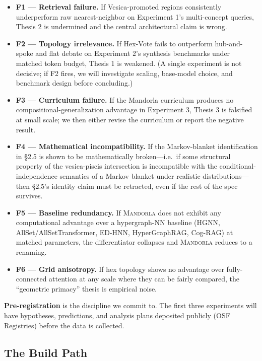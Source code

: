 \documentclass[11pt,a4paper]{article}
\begin{document}
\begin{itemize}[leftmargin=*]
  \item \textbf{F1 --- Retrieval failure.} If Vesica-promoted regions consistently underperform raw nearest-neighbor on Experiment 1's multi-concept queries, Thesis 2 is undermined and the central architectural claim is wrong.
  \item \textbf{F2 --- Topology irrelevance.} If Hex-Vote fails to outperform hub-and-spoke and flat debate on Experiment 2's synthesis benchmarks under matched token budget, Thesis 1 is weakened. (A single experiment is not decisive; if F2 fires, we will investigate scaling, base-model choice, and benchmark design before concluding.)
  \item \textbf{F3 --- Curriculum failure.} If the Mandorla curriculum produces no compositional-generalization advantage in Experiment 3, Thesis 3 is falsified at small scale; we then either revise the curriculum or report the negative result.
  \item \textbf{F4 --- Mathematical incompatibility.} If the Markov-blanket identification in \S 2.5 is shown to be mathematically broken---i.e.\ if some structural property of the vesica-piscis intersection is incompatible with the conditional-independence semantics of a Markov blanket under realistic distributions---then \S 2.5's identity claim must be retracted, even if the rest of the spec survives.
  \item \textbf{F5 --- Baseline redundancy.} If \textsc{Mandorla} does not exhibit any computational advantage over a hypergraph-NN baseline (HGNN, AllSet/AllSetTransformer, ED-HNN, HyperGraphRAG, Cog-RAG) at matched parameters, the differentiator collapses and \textsc{Mandorla} reduces to a renaming.
  \item \textbf{F6 --- Grid anisotropy.} If hex topology shows no advantage over fully-connected attention at any scale where they can be fairly compared, the ``geometric primacy'' thesis is empirical noise.
\end{itemize}

\textbf{Pre-registration} is the discipline we commit to. The first three experiments will have hypotheses, predictions, and analysis plans deposited publicly (OSF Registries) before the data is collected.

\subsection{The Build Path}
\end{document}
